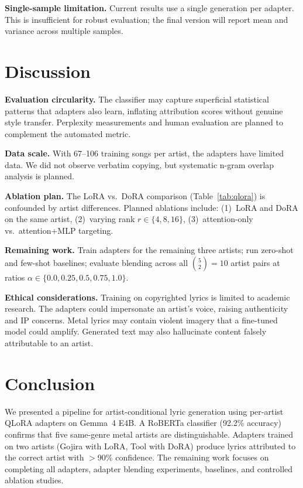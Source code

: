 \documentclass[runningheads]{llncs}
\begin{document}
\textbf{Single-sample limitation.}
Current results use a single generation per adapter. This is insufficient for robust evaluation; the final version will report mean and variance across multiple samples.

\section{Discussion}
\label{sec:discussion}

\textbf{Evaluation circularity.}
The classifier may capture superficial statistical patterns that adapters also learn, inflating attribution scores without genuine style transfer. Perplexity measurements and human evaluation are planned to complement the automated metric.

\textbf{Data scale.}
With 67--106 training songs per artist, the adapters have limited data. We did not observe verbatim copying, but systematic n-gram overlap analysis is planned.

\textbf{Ablation plan.}
The LoRA vs.\ DoRA comparison (Table~\ref{tab:qlora}) is confounded by artist differences. Planned ablations include: (1)~LoRA and DoRA on the same artist, (2)~varying rank $r \in \{4, 8, 16\}$, (3)~attention-only vs.\ attention+MLP targeting.

\textbf{Remaining work.}
Train adapters for the remaining three artists; run zero-shot and few-shot baselines; evaluate blending across all $\binom{5}{2} = 10$ artist pairs at ratios $\alpha \in \{0.0, 0.25, 0.5, 0.75, 1.0\}$.

\textbf{Ethical considerations.}
Training on copyrighted lyrics is limited to academic research. The adapters could impersonate an artist's voice, raising authenticity and IP concerns. Metal lyrics may contain violent imagery that a fine-tuned model could amplify. Generated text may also hallucinate content falsely attributable to an artist.

\section{Conclusion}
\label{sec:conclusion}

We presented a pipeline for artist-conditional lyric generation using per-artist QLoRA adapters on Gemma~4 E4B. A RoBERTa classifier (92.2\% accuracy) confirms that five same-genre metal artists are distinguishable. Adapters trained on two artists (Gojira with LoRA, Tool with DoRA) produce lyrics attributed to the correct artist with $>$90\% confidence. The remaining work focuses on completing all adapters, adapter blending experiments, baselines, and controlled ablation studies.



\end{document}
